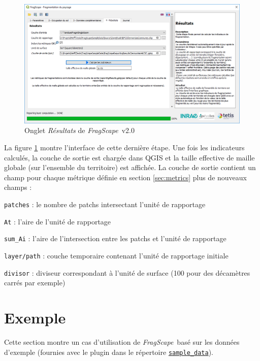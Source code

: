 \documentclass[11pt]{article}
\newcommand{\source}[1]{\vspace*{-0.4cm}\caption*{\textit{Source: {#1}}}}
\newcommand{\tool}{\emph{FragScape}}
\let\tempone\itemize
\let\temptwo\enditemize
\renewenvironment{itemize}{\tempone\addtolength{\itemsep}{-0.5\baselineskip}}{\temptwo}
\begin{document}
\begin{figure}[h!]
    \centering
    \includegraphics[scale=0.6]{pictures/resTabFr_v2.png}
    \caption{Onglet \textit{Résultats} de \tool\ v2.0}
    \label{fig:resultsTab}
\end{figure}


La figure \ref{fig:resultsTab} montre l'interface de cette dernière étape.
Une fois les indicateurs calculés, la couche de sortie est chargée dans QGIS et la taille effective de maille globale (sur l'ensemble du territoire) est affichée.
La couche de sortie contient un champ pour chaque métrique définie en section \ref{sec:metrics} plus de nouveaux champs :
\begin{itemize}
    \item \texttt{patches} : le nombre de patchs intersectant l'unité de rapportage
    \item \texttt{At} : l'aire de l'unité de rapportage
    \item \texttt{sum\_Ai} : l'aire de l'intersection entre les patchs et l'unité de rapportage
    \item \texttt{layer/path} : couche temporaire contenant l'unité de rapportage initiale
    \item \texttt{divisor} : diviseur correspondant à l'unité de surface (100 pour des décamètres carrés par exemple)
\end{itemize}

\pagebreaks

\section{Exemple}

Cette section montre un cas d'utilisation de \tool\ basé sur les données d'exemple (fournies avec le plugin dans le répertoire \href{https://github.com/MathieuChailloux/FragScape/tree/master/sample_data/EPCI_Clermontais_2012}{\texttt{sample\_data}}).
\end{document}
